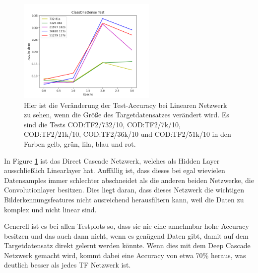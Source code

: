 \begin{figure}[htpb]
    \centering
    \includegraphics[height=5cm]{../../Plots/ba_plots/targetgroesse/cod_ts.png}
    \caption{\label{fig:targetgroesselinear} 
    \small{Hier ist die Veränderung der Test-Accuracy bei Linearen Netzwerk zu sehen, wenn die Größe des Targetdatensatzes verändert wird. 
    Es sind die Tests COD:TF2/732/10, COD:TF2/7k/10, COD:TF2/21k/10, COD:TF2/36k/10 und COD:TF2/51k/10 in den Farben gelb, grün, lila, blau und 
    rot. }}
\end{figure}

In Figure \ref{fig:targetgroesselinear} ist das Direct Cascade Netzwerk, welches als Hidden Layer ausschließlich Linearlayer hat. Auffällig ist, dass dieses bei egal 
wievielen Datensamples immer schlechter abschneidet als die anderen beiden Netzwerke, die Convolutionlayer besitzen. 
Dies liegt daran, dass dieses Netzwerk die wichtigen Bilderkennungsfeatures nicht ausreichend herausfiltern kann, weil die Daten zu komplex und 
nicht linear sind. 

Generell ist es bei allen Testplots so, dass sie nie eine annehmbar hohe Accuracy besitzen und das auch dann nicht, wenn es genügend Daten 
gibt, damit auf dem Targetdatensatz direkt gelernt werden könnte. Wenn dies mit dem Deep Cascade Netzwerk gemacht wird, kommt dabei eine 
Accuracy von etwa 70\% heraus, was deutlich besser als jedes TF Netzwerk ist. 
